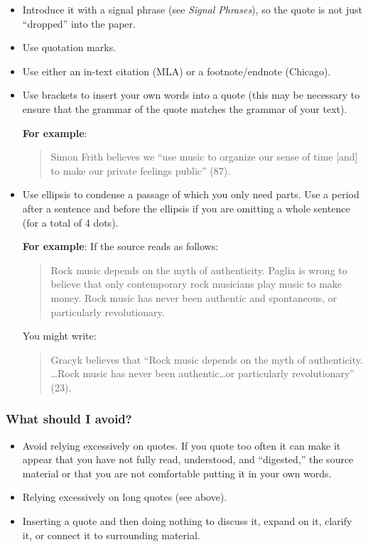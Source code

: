  \begin{itemize}       	
\item Introduce it with a signal phrase (see \emph{Signal Phrases}), so the quote is not just ``dropped'' into the paper.

\item Use quotation marks.

\item Use either an in-text citation (MLA) or a footnote/endnote (Chicago).
        	
\item Use brackets to insert your own words into a quote (this may be necessary to ensure that the grammar of the quote matches the grammar of your text).

\textbf{For example}:

\begin{quote} Simon Frith believes we ``use music to organize our sense of time [and] to make our private feelings public'' (87). 
\end{quote}

\item Use ellipsis to condense a passage of which you only need parts. Use a period after a sentence and before the ellipsis if you are omitting a whole sentence (for a total of 4
dots).

\textbf{For example}:
 If the source reads as follows:
\begin{quote}
Rock music depends on the myth of authenticity. Paglia is wrong to believe that only contemporary rock musicians play music to make money. Rock music has never been authentic and spontaneous, or particularly revolutionary.
\end{quote}
         
You might write:
\begin{quote}
Gracyk believes that ``Rock music depends on the myth of authenticity. \ldots Rock music has never been authentic\ldots  or particularly revolutionary'' (23).
 \end{quote}
 \end{itemize}
 
\subsubsection{What should I avoid?}

\begin{itemize}
\item Avoid relying excessively on quotes. If you quote too often it can make it appear that you have not fully read, understood, and ``digested,'' the source material or that you are not comfortable putting it in your own words.

\item Relying excessively on long quotes (see above).

\item Inserting a quote and then doing nothing to discuss it, expand on it, clarify it, or connect it to surrounding material.

\end{itemize}


